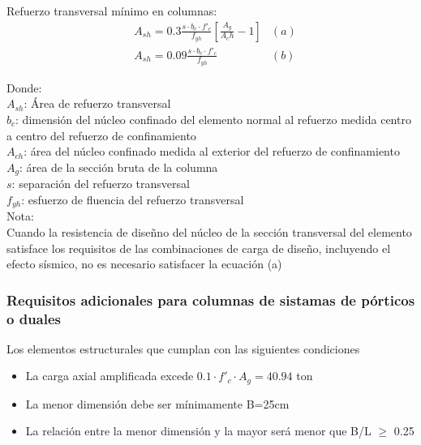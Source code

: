 \documentclass[12pt]{article}
\begin{document}
        Refuerzo transversal mínimo en columnas:
        \begin{align*}
            &A_{sh} = 0.3\frac{s \cdot b_c \cdot f'_c}{f_{yh}} \left[ \frac{A_g}{A_ch} -1  \right] &(a)\\
            &A_{sh} = 0.09 \frac{s \cdot b_c \cdot f'_c}{f_{yh}} &(b)
        \end{align*}

        Donde: \\
        $A_{sh}$: Área de refuerzo transversal\\
        $b_c$: dimensión del núcleo confinado del elemento normal al refuerzo medida centro a centro del refuerzo de confinamiento\\
        $A_{ch}$: área del núcleo confinado medida al exterior del refuerzo de confinamiento\\
        $A_g$: área de la sección bruta de la columna\\
        $s$: separación del refuerzo transversal\\
        $f_{yh}$: esfuerzo de fluencia del refuerzo transversal\\

        Nota:\\
        Cuando la resistencia de diseñno del núcleo de la sección transversal del elemento satisface
        los requisitos de las combinaciones de carga de diseño, incluyendo el efecto sísmico, no
        es necesario satisfacer la ecuación (a)\\

        \subsubsection{Requisitos adicionales para columnas de sistamas de pórticos o duales}
        Los elementos estructurales que cumplan con las siguientes condiciones 
        \begin{itemize}
            \item La carga axial amplificada excede $0.1 \cdot f'_c \cdot A_g = 40.94$ ton
            \item La menor dimensión debe ser mínimamente B=25cm
            \item La relación entre la menor dimensión y la mayor será menor que B/L $\geq$ 0.25      
        \end{itemize}
\end{document}
